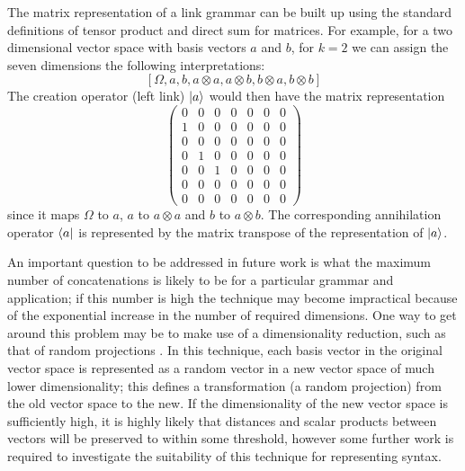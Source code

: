 The matrix representation of a link grammar can be built up using the standard definitions of tensor product and direct sum for matrices. For example, for a two dimensional vector space with basis vectors $a$ and $b$, for $k = 2$ we can assign the seven dimensions the following interpretations:
$$[\Omega, a, b, a\otimes a, a\otimes b, b\otimes a, b\otimes b]$$
The creation operator (left link) $|a \rangle$ would then have the matrix representation
$$\left(\begin{array}{ccccccc}
0&0&0&0&0&0&0\\
1&0&0&0&0&0&0\\
0&0&0&0&0&0&0\\
0&1&0&0&0&0&0\\
0&0&1&0&0&0&0\\
0&0&0&0&0&0&0\\
0&0&0&0&0&0&0
\end{array}\right)$$
since it maps $\Omega$ to $a$, $a$ to $a\otimes a$ and $b$ to $a\otimes b$. The corresponding annihilation operator $\langle a|$ is represented by the matrix transpose of the representation of $|a \rangle$.

An important question to be addressed in future work is what the maximum number of concatenations is likely to be for a particular grammar and application; if this number is high the technique may become impractical because of the exponential increase in the number of required dimensions. One way to get around this problem may be to make use of a dimensionality reduction, such as that of random projections \citep{Papadimitriou:98, Sahlgren:02}. In this technique, each basis vector in the original vector space is represented as a random vector in a new vector space of much lower dimensionality; this defines a transformation (a random projection) from the old vector space to the new. If the dimensionality of the new vector space is sufficiently high, it is highly likely that distances and scalar products between vectors will be preserved to within some threshold, however some further work is required to investigate the suitability of this technique for representing syntax.





